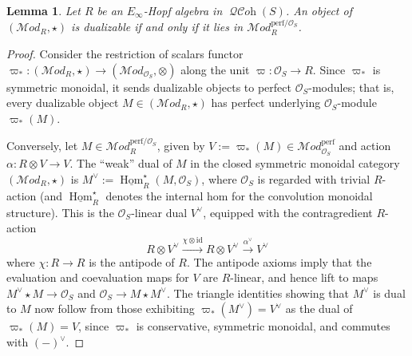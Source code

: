 \documentclass[12pt, oneside]{amsart}
\numberwithin{equation}{section}
\newtheorem{lemma}[subsubsection]{Lemma}
\theoremstyle{remark}
\theoremstyle{plain}
\newcommand{\MOD}{\mathcal{M}\textit{od}}
\DeclareMathOperator{\QCOH}{\mathcal{QC}\textit{oh}}
\newcommand{\hhoms}{\underline{\operatorname{Hom}}}
\newcommand{\OO}{\mathcal{O}}
\newcommand{\id}{\mathrm{id}}
\begin{document}
\begin{lemma}\label{lem:dual mod conv}
  Let $R$ be an $E_\infty$-Hopf algebra in $\QCOH(S)$.
  An object of $(\MOD_R, \star)$ is dualizable if and only if it lies in $\MOD_{R}^{\mathrm{perf}/\OO_S}$.
\end{lemma}
\begin{proof}
  Consider the restriction of scalars functor $\varpi_* : (\MOD_R, \star) \to (\MOD_{\OO_S}, \otimes)$ along the unit $\varpi : \OO_S \to R$.
  Since $\varpi_*$ is symmetric monoidal, it sends dualizable objects to perfect $\OO_S$-modules; that is, every dualizable object $M \in (\MOD_R, \star)$ has perfect underlying $\OO_S$-module $\varpi_*(M)$.

  Conversely, let $M \in \MOD_R^{\mathrm{perf}/\OO_S}$, given by $V := \varpi_*(M) \in \MOD_{\OO_S}^{\mathrm{perf}}$ and action $\alpha : R \otimes V \to V$.
  The ``weak'' dual of $M$ in the closed symmetric monoidal category $(\MOD_R, \star)$ is $M^\vee := \hhoms_R^{\star}(M, \OO_S)$, where $\OO_S$ is regarded with trivial $R$-action (and $\hhoms_R^{\star}$ denotes the internal hom for the convolution monoidal structure).
  This is the $\OO_S$-linear dual $V^\vee$, equipped with the contragredient $R$-action
  $$ R \otimes V^\vee \xrightarrow{\chi \otimes \id} R \otimes V^\vee \xrightarrow{\alpha^\vee} V^\vee $$
  where $\chi : R \to R$ is the antipode of $R$.
  The antipode axioms imply that the evaluation and coevaluation maps for $V$ are $R$-linear, and hence lift to maps $M^\vee \star M \to \OO_S$ and $\OO_S \to M \star M^\vee$.
  The triangle identities showing that $M^\vee$ is dual to $M$ now follow from those exhibiting $\varpi_*(M^\vee) = V^\vee$ as the dual of $\varpi_*(M) = V$, since $\varpi_*$ is conservative, symmetric monoidal, and commutes with $(-)^\vee$.
\end{proof}

\subsubsection{}
\end{document}
